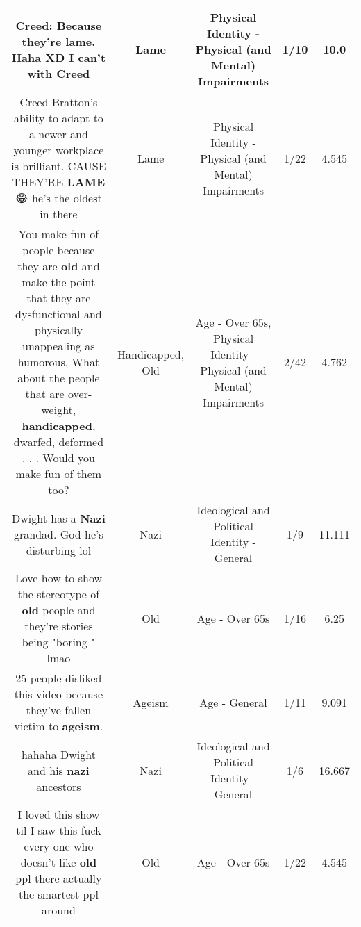 \documentclass[11pt]{article}
\newlength\mylength
\begin{document}
\begin{center}
\begin{longtable}{|C{.65\mylength}|C{.30\mylength}|C{.12\mylength}|C{.12\mylength}|C{.12\mylength}|}
  \small Creed: Because they're \textbf{lame}. Haha XD I can't with Creed\normalsize   & Lame & Physical Identity - Physical (and Mental) Impairments & 1/10 & 10.0 \\  \hline
  \small Creed Bratton's ability to adapt to a newer and younger workplace is brilliant. CAUSE THEY'RE \textbf{LAME} 😂 he's the oldest in there\normalsize   & Lame & Physical Identity - Physical (and Mental) Impairments & 1/22 & 4.545 \\  \hline
  \small You make fun of people because they are \textbf{old} and make the point that they are dysfunctional and physically unappealing as humorous. What about the people that are over-weight, \textbf{handicapped}, dwarfed, deformed . . . Would you make fun of them too?\normalsize   & Handicapped, Old & Age - Over 65s, Physical Identity - Physical (and Mental) Impairments & 2/42 & 4.762 \\  \hline
  \small Dwight has a \textbf{Nazi} grandad. God he's disturbing lol\normalsize   & Nazi &  Ideological and Political Identity - General & 1/9 & 11.111 \\  \hline
  \small Love how to show the stereotype of \textbf{old} people and they're stories being "boring  " lmao\normalsize   & Old & Age - Over 65s & 1/16 & 6.25 \\  \hline
  \small 25 people disliked this video because they've fallen victim to \textbf{ageism}.\normalsize   & Ageism & Age - General & 1/11 & 9.091 \\  \hline
  \small hahaha Dwight and his \textbf{nazi} ancestors\normalsize   & Nazi &  Ideological and Political Identity - General & 1/6 & 16.667 \\  \hline
  \small I loved this show til I saw this fuck every one who doesn't like \textbf{old} ppl there actually the smartest ppl around\normalsize   & Old & Age - Over 65s & 1/22 & 4.545 \\  \hline

\end{longtable}
\end{center}
\end{document}
